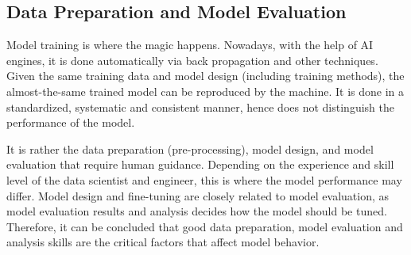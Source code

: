 \subsection{Data Preparation and Model Evaluation}

Model training is where the magic happens. Nowadays, with the help of AI engines, it is done automatically via back propagation and other techniques. Given the same training data and model design (including training methods), the almost-the-same trained model can be reproduced by the machine. It is done in a standardized, systematic and consistent manner, hence does not distinguish the performance of the model.

It is rather the data preparation (pre-processing), model design, and model evaluation that require human guidance. Depending on the experience and skill level of the data scientist and engineer, this is where the model performance may differ. Model design and fine-tuning are closely related to model evaluation, as model evaluation results and analysis decides how the model should be tuned. Therefore, it can be concluded that good data preparation, model evaluation and analysis skills are the critical factors that affect model behavior.

